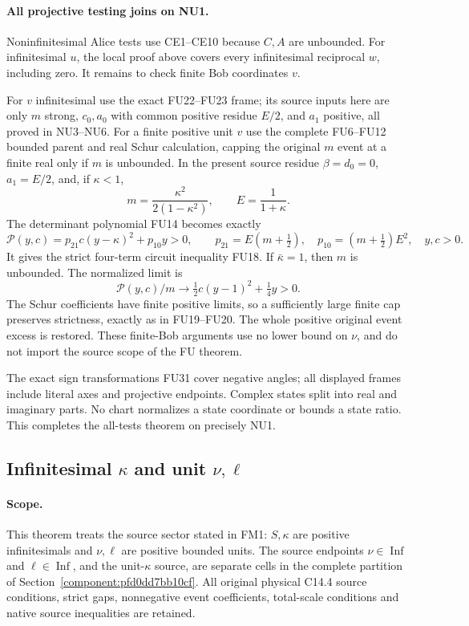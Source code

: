 \paragraph{All projective testing joins on NU1.}
Noninfinitesimal Alice tests use CE1--CE10 because $C,A$ are
unbounded. For infinitesimal $u$, the local proof above covers
every infinitesimal reciprocal $w$, including zero. It remains
to check finite Bob coordinates $v$.

For $v$ infinitesimal use the exact FU22--FU23 frame; its source
inputs here are only $m$ strong, $c_0,a_0$ with common positive
residue $E/2$, and $a_1$ positive, all proved in NU3--NU6.
For a finite positive unit $v$ use the complete FU6--FU12
bounded parent and real Schur calculation, capping the original
$m$ event at a finite real only if $m$ is unbounded. In the
present source residue $\beta=d_0=0$, $a_1=E/2$, and, if
$\kappa<1$,
\[
 m=\frac{\kappa^2}{2(1-\kappa^2)},\qquad E=\frac1{1+\kappa}.
 \tag{NU24}
\]
The determinant polynomial FU14 becomes exactly
\[
 \mathcal P(y,c)=p_{21}c(y-\kappa)^2+p_{10}y>0,
 \qquad p_{21}=E(m+\tfrac12),\quad
 p_{10}=(m+\tfrac12)E^2,\quad y,c>0.
 \tag{NU25}
\]
It gives the strict four-term circuit inequality FU18. If
$\bar\kappa=1$, then $m$ is unbounded. The normalized limit is
\[
 \mathcal P(y,c)/m\longrightarrow
              \tfrac12c(y-1)^2+\tfrac14y>0.
 \tag{NU26}
\]
The Schur coefficients have finite positive limits, so a
sufficiently large finite cap preserves strictness, exactly as
in FU19--FU20. The whole positive original event excess is
restored. These finite-Bob arguments use no lower bound on
$\nu$, and do not import the source scope of the FU theorem.

The exact sign transformations FU31 cover negative angles;
all displayed frames include literal axes and projective
endpoints. Complex states split into real and imaginary parts.
No chart normalizes a state coordinate or bounds a state ratio.
This completes the all-tests theorem on precisely NU1.



\subsection{Infinitesimal $\kappa$ and unit $\nu,\ell$}

\label{component:p2edb55cd1f69}

\label{p2edb55cd1f69:sec:new-c144-finite-matched}

\paragraph{Scope.}
This theorem treats the source sector stated in FM1: $S,\kappa$ are positive infinitesimals and $\nu,\ell$ are positive bounded units. The source endpoints $\nu\in\operatorname{Inf}$ and $\ell\in\operatorname{Inf}$, and the unit-$\kappa$ source, are separate cells in the complete partition of Section~\ref{component:pfd0dd7bb10cf}. All original physical C14.4 source conditions, strict gaps, nonnegative event coefficients, total-scale conditions and native source inequalities are retained.

